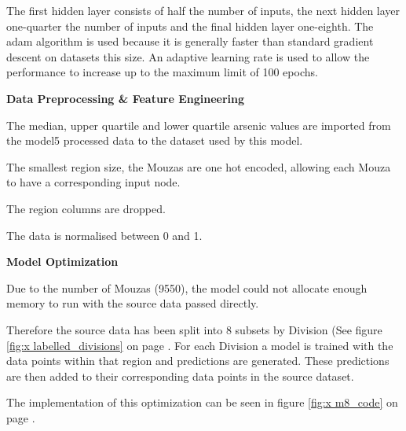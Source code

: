 The first hidden layer consists of half the number of inputs, the next hidden layer one-quarter the number of inputs and the final hidden layer one-eighth. The adam algorithm is used because it is generally faster than standard gradient descent on datasets this size. An adaptive learning rate is used to allow the performance to increase up to the maximum limit of 100 epochs.

\textbf{Data Preprocessing \& Feature Engineering}

The median, upper quartile and lower quartile arsenic values are imported from the model5 processed data to the dataset used by this model.

The smallest region size, the Mouzas are one hot encoded, allowing each Mouza to have a corresponding input node.

The region columns are dropped.

The data is normalised between 0 and 1.

\textbf{Model Optimization}

Due to the number of Mouzas (9550), the model could not allocate enough memory to run with the source data passed directly.

Therefore the source data has been split into 8 subsets by Division (See figure \ref{fig:x labelled_divisions} on page \pageref{fig:x labelled_divisions}. For each Division a model is trained with the data points within that region and predictions are generated. These predictions are then added to their corresponding data points in the source dataset.

The implementation of this optimization can be seen in figure \ref{fig:x m8_code} on page \pageref{fig:x m8_code}.

